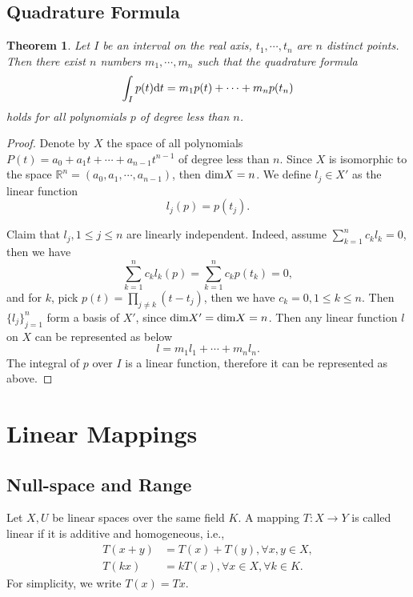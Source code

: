 \documentclass[11pt]{book}
\newtheorem{theorem}{Theorem}[chapter]
\theoremstyle{definition}
\numberwithin{equation}{chapter}
\begin{document}
\section{Quadrature Formula}
\begin{theorem}
Let $I$ be an interval on the real axis, $t_1, \cdots, t_n$ are $n$ distinct points. Then there exist $n$ numbers $m_1,\cdots,m_n$ such that the quadrature formula
\begin{align*}
    \int_I p(t) {\rm d}t = m_1 p(t) + \cdots + m_n p(t_n)
\end{align*}
holds for all polynomials $p$ of degree less than $n$.
\end{theorem}
\begin{proof}
Denote by $X$ the space of all polynomials $P(t) = a_0 + a_1 t +\cdots+ a_{n-1}t^{n-1}$ of degree less than $n$. Since $X$ is isomorphic to the space $\mathbb{R}^n = (a_0,a_1,\cdots,a_{n-1})$, then ${\rm dim}X = n$. We define $l_j\in X'$ as the linear function 
$$l_j(p) = p(t_j).$$

Claim that $l_j, 1\leq j \leq n$ are linearly independent. Indeed, assume $\sum^n_{k=1}c_k l_k = 0$, then we have 
$$\sum^n_{k=1}c_k l_k(p) = \sum^n_{k=1}c_k p(t_k) = 0,$$
and for $k$, pick $p(t) = \prod_{j\neq k}(t - t_j)$, then we have $c_k = 0, 1\leq k\leq n$. Then $\{l_j\}^n_{j=1}$ form a basis of $X'$, since ${\rm dim}X' = {\rm dim}X = n$. Then any linear function $l$ on $X$ can be represented as below
$$l = m_1 l_1 + \cdots + m_n l_n.$$
The integral of $p$ over $I$ is a linear function, therefore it can be represented as above.
\end{proof}


\medskip

\chapter{Linear Mappings}
\section{Null-space and Range}

Let $X,U$ be linear spaces over the same field $K$. A mapping $T:X\to Y$ is called linear if it is additive and homogeneous, i.e.,
\begin{align*}
    T(x+y) &= T(x)+T(y), \forall x,y \in X,\\
    T(k x) &= k T(x), \forall x\in X, \forall k\in K.
\end{align*}
For simplicity, we write $T(x) = T x$.
\end{document}
